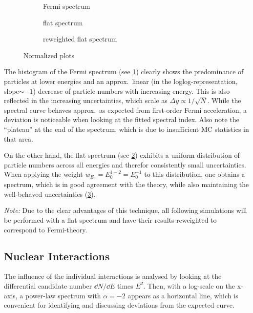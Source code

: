 \begin{figure}[ht]
    \begin{subfigure}[b]{.75\textwidth}
        \centering
        \caption{Fermi spectrum}
        \label{fig:rew-fermi}
    \end{subfigure}
    \begin{subfigure}[b]{.75\textwidth}
        \centering
        \caption{flat spectrum}
        \label{fig:rew-flat}
    \end{subfigure}
    \begin{subfigure}[b]{.75\textwidth}
        \centering
        \caption{reweighted flat spectrum}
        \label{fig:rew-rew}
    \end{subfigure}
    \caption{Normalized plots}
    \label{fig:rew}
\end{figure}

The histogram of the Fermi spectrum (see \cref{fig:rew-fermi}) clearly shows
the predominance of particles at lower energies and an approx.~linear (in
the loglog-representation, slope$\sim-1$) decrease of particle numbers with
increasing energy. This is also reflected in the increasing uncertainties,
which scale as $\Delta{y}\propto1/\sqrt{N}$.
While the spectral curve behaves approx.~as expected from first-order Fermi
acceleration, a deviation is noticeable when looking at the fitted spectral
index.
Also note the \enquote{plateau} at the end of the spectrum, which is due to
insufficient MC statistics in that area.

On the other hand, the flat spectrum (see \cref{fig:rew-flat}) exhibits a
uniform distribution of particle numbers across all energies and therefor
consistently small uncertainties. When applying the weight
$w_{E_0}=E_0^{1-2}=E_0^{-1}$ to this distribution, one obtains a spectrum,
which is in good agreement with the theory, while also maintaining the
well-behaved uncertainties (\cref{fig:rew-rew}).

\emph{Note:} Due to the clear advantages of this technique, all following
simulations will be performed with a flat spectrum and have their results
reweighted to correspond to Fermi-theory.



\subsection{Nuclear Interactions}
The influence of the individual interactions is analysed by looking at the
differential candidate number $\dd{N}/\dd{E}$ times $E^2$. Then, with a
log-scale on the x-axis, a power-law spectrum with $\alpha=-2$ appears as a
horizontal line, which is convenient for identifying and discussing deviations
from the expected curve.


